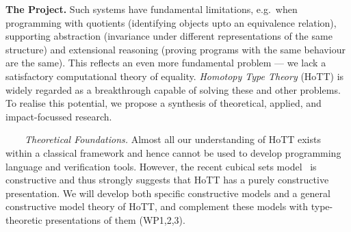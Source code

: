 \documentclass[a4paper,11pt]{article}
\newcommand{\eg}{{e.g.}\ }
\begin{document}
{\bf The Project.} Such systems have fundamental limitations, \eg when
programming with quotients (identifying objects upto an equivalence
relation), supporting abstraction (invariance under different
representations of the same structure) and extensional reasoning
(proving programs with the same behaviour are the same). This reflects
an even more fundamental problem --- we lack a satisfactory
computational theory of equality.  {\em Homotopy Type Theory} (HoTT)
is widely regarded as a breakthrough capable of solving
these and other problems.
To realise this potential, we propose a synthesis of theoretical, applied, and impact-focussed research.






$\;\;\; \;\;\;$ {\em Theoretical Foundations.} 
Almost all our understanding of HoTT exists 
within a classical framework and hence
cannot be used to develop programming language and verification
tools. However, the recent cubical sets model~\cite{BezemM:cubsmt,nominal} is constructive and
thus strongly suggests that HoTT has a purely constructive
presentation. We will develop both specific constructive models and a
general constructive model theory of HoTT, and complement these models
with type-theoretic presentations of them (WP1,2,3).
\end{document}
